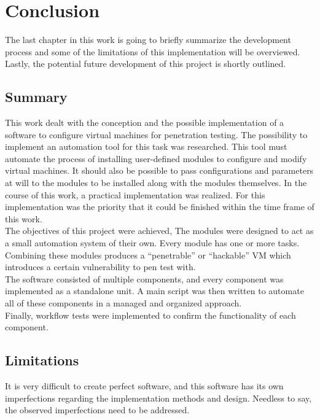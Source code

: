 \chapter{Conclusion}
The last chapter in this work is going to briefly summarize the development process and some of the limitations of this implementation will be overviewed. Lastly, the potential future development of this project is shortly outlined.

\section{Summary}
This work dealt with the conception and the possible implementation of a software to configure virtual machines for penetration testing. The possibility to implement an automation tool for this task was researched. This tool must automate the process of installing user-defined modules to configure and modify virtual machines. It should also be possible to pass configurations and parameters at will to the modules to be installed along with the modules themselves.
In the course of this work, a practical implementation was realized. For this implementation
was the priority that it could be finished within the time frame of this work.\\
The objectives of this project were achieved,
The modules were designed to act as a small automation system of their own. Every module has one or more tasks. Combining these modules produces a “penetrable” or “hackable” VM which introduces a certain vulnerability to pen test with.\\
The software consisted of multiple components, and every component was implemented as a standalone unit. A main script was then written to automate all of these components in a managed and organized approach.\\ Finally, workflow tests were implemented to confirm the functionality of each component.

\section{Limitations}
It is very difficult to create perfect software, and this software has its own imperfections regarding the implementation methods and design. Needless to say, the observed imperfections need to be addressed.

